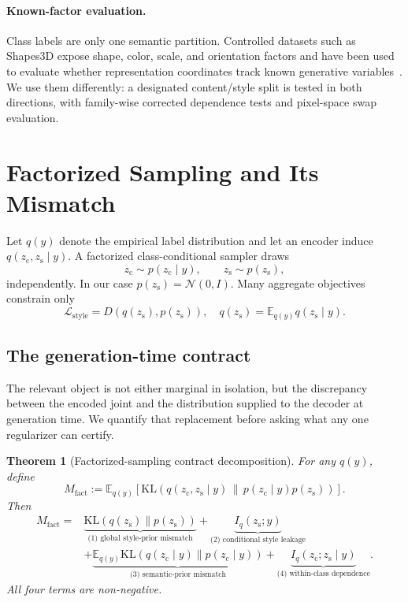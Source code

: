 \documentclass{article}
\newtheorem{theorem}{Theorem}
\newcommand{\zc}{z_{\mathrm{c}}}
\newcommand{\zs}{z_{\mathrm{s}}}
\newcommand{\KL}{\mathrm{KL}}
\begin{document}
\paragraph{Known-factor evaluation.}
Class labels are only one semantic partition.  Controlled datasets such as
Shapes3D expose shape, color, scale, and orientation factors and have been
used to evaluate whether representation coordinates track known generative
variables~\citep{higgins2017beta,locatello2019challenging,deepmind2018shapes3d}.
We use them differently: a designated content/style split is tested in both
directions, with family-wise corrected dependence tests and pixel-space swap
evaluation.

\section{Factorized Sampling and Its Mismatch}
\label{sec:theory}

Let $q(y)$ denote the empirical label distribution and let an encoder induce
$q(\zc,\zs\mid y)$.  A factorized class-conditional sampler draws
\begin{equation}
    \zc\sim p(\zc\mid y),\qquad \zs\sim p(\zs),
    \label{eq:sampler}
\end{equation}
independently.  In our case $p(\zs)=\mathcal N(0,I)$.  Many aggregate
objectives constrain only
\begin{equation}
    \mathcal L_{\mathrm{style}}=D\!\left(q(\zs),p(\zs)\right),
    \quad q(\zs)=\mathbb E_{q(y)}q(\zs\mid y).
    \label{eq:global-style}
\end{equation}

\subsection{The generation-time contract}

The relevant object is not either marginal in isolation, but the discrepancy
between the encoded joint and the distribution supplied to the decoder at
generation time.  We quantify that replacement before asking what any one
regularizer can certify.

\begin{theorem}[Factorized-sampling contract decomposition]
\label{thm:decomp}
For any $q(y)$, define
\begin{equation}
M_{\mathrm{fact}}:=\mathbb E_{q(y)}\!\left[
\KL\!\left(q(\zc,\zs\mid y)\,\|\,p(\zc\mid y)p(\zs)\right)\right].
\end{equation}
Then
\begin{align}
M_{\mathrm{fact}}={}&
\underbrace{\KL(q(\zs)\|p(\zs))}_{\text{(1) global style-prior mismatch}}
+\underbrace{I_q(\zs;y)}_{\text{(2) conditional style leakage}}\nonumber\\
&+\underbrace{\mathbb E_{q(y)}\KL(q(\zc\mid y)\|p(\zc\mid y))}_{\text{(3) semantic-prior mismatch}}
+\underbrace{I_q(\zc;\zs\mid y)}_{\text{(4) within-class dependence}}.
\label{eq:decomp}
\end{align}
All four terms are non-negative.
\end{theorem}
\end{document}
